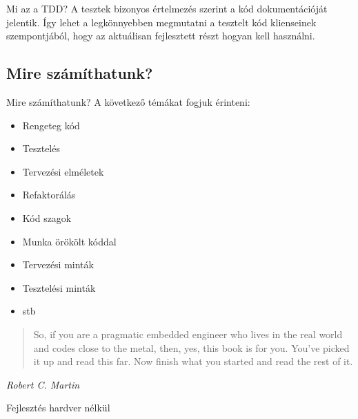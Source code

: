 \begin{frame}{Mi az a TDD?}
  A tesztek bizonyos értelmezés szerint a kód dokumentációját
  jelentik. Így lehet a legkönnyebben megmutatni a tesztelt kód
  klienseinek szempontjából, hogy az aktuálisan fejlesztett részt
  hogyan kell használni.
\end{frame}

\subsection{Mire számíthatunk?}

\begin{frame}{Mire számíthatunk?}
 A következő témákat fogjuk érinteni:

  \begin{itemize}[<+->]
    \item Rengeteg kód
    \item Tesztelés
    \item Tervezési elméletek
    \item Refaktorálás
    \item Kód szagok
    \item Munka örökölt kóddal
    \item Tervezési minták
    \item Tesztelési minták
    \item stb
  \end{itemize}

\end{frame}

\begin{frame}{}
  \begin{quotation}
    So, if you are a pragmatic embedded engineer who
    lives in the real world and codes close to the metal, then, yes, this
    book is for you. You've picked it up and read this far. Now finish
    what you started and read the rest of it.
  \end{quotation}
\textit{Robert C. Martin}
\end{frame}

\begin{frame}{Fejlesztés hardver nélkül}

\end{frame}

